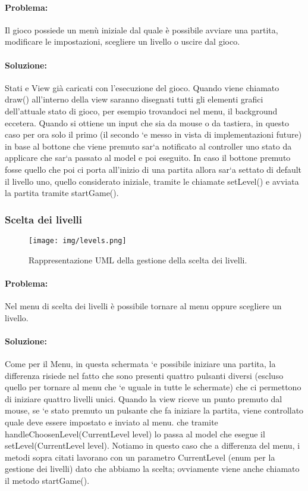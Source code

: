 \paragraph{Problema:}
Il gioco possiede un menù iniziale dal quale è possibile avviare una partita, modificare le impostazioni, scegliere un livello o uscire dal gioco.

\paragraph{Soluzione:}
Stati e View già caricati con l'esecuzione del gioco. Quando viene chiamato draw() all’interno della view saranno disegnati tutti gli elementi grafici dell’attuale stato di gioco, per esempio trovandoci nel menu, il background eccetera. Quando si ottiene un input che sia da mouse o da tastiera, in questo caso per ora solo il primo (il secondo `e messo in vista di implementazioni future) in base al bottone che viene premuto sar`a notificato al controller uno stato da applicare che sar`a passato al model e poi eseguito. In caso il bottone premuto fosse quello che poi ci porta all’inizio di una partita allora sar`a settato di default il livello uno, quello considerato iniziale, tramite le chiamate setLevel() e avviata la partita tramite startGame().

\subsubsection{Scelta dei livelli}

\begin{figure}[H]
\centering{}
\texttt{[image: img/levels.png]}
\caption{Rappresentazione UML della gestione della scelta dei livelli.}
\end{figure}

\paragraph{Problema:}
Nel menu di scelta dei livelli è possibile tornare al menu oppure scegliere un livello.

\paragraph{Soluzione:}
Come per il Menu, in questa schermata `e possibile iniziare una partita, la differenza risiede nel fatto che sono presenti quattro pulsanti diversi (escluso quello per tornare al menu che `e uguale in tutte le schermate) che ci permettono di iniziare quattro livelli unici. Quando la view riceve un punto premuto dal mouse, se `e stato premuto un pulsante che fa iniziare la partita, viene controllato quale deve essere impostato e inviato al menu. che tramite handleChoosenLevel(CurrentLevel level) lo passa al model che esegue il setLevel(CurrentLevel level). Notiamo in questo caso che a differenza del menu, i metodi sopra citati lavorano con un parametro CurrentLevel (enum per la gestione dei livelli) dato che abbiamo la scelta; ovviamente viene anche chiamato il metodo startGame().

